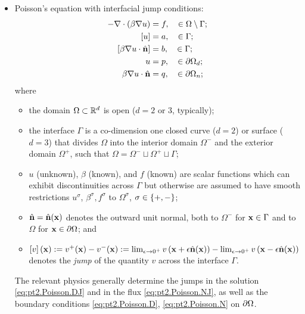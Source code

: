 \begin{itemize}

\item Poisson's equation with interfacial jump conditions:
\begin{subequations} \label{eq:pt2.Poisson}
\begin{align}
-\nabla \cdot \left( \beta \nabla u \right) & = f, \quad \in \Omega \setminus \Gamma; \label{eq:pt2.Poisson.PDE} \\
\left[ u \right] & = a, \quad \in \Gamma; \label{eq:pt2.Poisson.DJ} \\
\left[ \beta \nabla u \cdot \hat{\mathbf{n}} \right] & = b, \quad \in \Gamma; \label{eq:pt2.Poisson.NJ} \\
u & = p, \quad \in \partial\Omega_d; \label{eq:pt2.Poisson.D} \\
\beta \nabla u \cdot \hat{\mathbf{n}} & = q, \quad \in \partial\Omega_n; \label{eq:pt2.Poisson.N}
\end{align}
\end{subequations}
where
\begin{itemize}
\item the domain $\Omega \subset \mathbb{R}^d$ is open ($d = 2 \text{ or } 3$, typically);
\item the interface $\Gamma$ is a co-dimension one closed curve ($d = 2$) or surface ($d = 3$) that divides $\Omega$ into the interior domain $\Omega^-$ and the exterior domain $\Omega^+$, such that $\Omega = \Omega^- \sqcup \Omega^+ \sqcup \Gamma$;
\item $u$ (unknown), $\beta$ (known), and $f$ (known) are scalar functions which can exhibit discontinuities across $\Gamma$ but otherwise are assumed to have smooth restrictions $u^{\sigma}$, $\beta^{\sigma}, f^{\sigma}$ to $\Omega^{\sigma}$, $\sigma \in \left\lbrace +,- \right\rbrace$;
\item $\hat{\mathbf{n}} = \hat{\mathbf{n}}(\mathbf{x})$ denotes the outward unit normal, both to $\Omega^-$ for $\mathbf{x} \in \Gamma$ and to $\Omega$ for $\mathbf{x} \in \partial\Omega$; and
\item $\left[ v \right](\mathbf{x}) := v^+(\mathbf{x}) - v^-(\mathbf{x}) := \lim_{\epsilon \to 0^+} v\left( \mathbf{x} + \epsilon \hat{\mathbf{n}}(\mathbf{x}) \right) - \lim_{\epsilon \to 0^+} v\left( \mathbf{x} - \epsilon \hat{\mathbf{n}}(\mathbf{x}) \right)$ denotes the \emph{jump} of the quantity $v$ across the interface $\Gamma$.
\end{itemize}
The relevant physics generally determine the jumps in the solution \eqref{eq:pt2.Poisson.DJ} and in the flux \eqref{eq:pt2.Poisson.NJ}, as well as the boundary conditions \eqref{eq:pt2.Poisson.D}, \eqref{eq:pt2.Poisson.N} on $\partial\Omega$.


\end{itemize}
